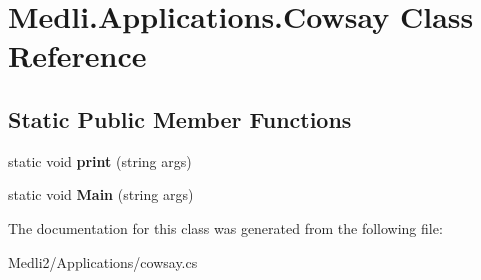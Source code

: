 \hypertarget{class_medli_1_1_applications_1_1_cowsay}{}\section{Medli.\+Applications.\+Cowsay Class Reference}
\label{class_medli_1_1_applications_1_1_cowsay}
\subsection*{Static Public Member Functions}
\begin{DoxyCompactItemize}
\item 
\mbox{\label{class_medli_1_1_applications_1_1_cowsay_a0ad9bb6cbac5420df2c8b218f436d370}} 
static void {\bfseries print} (string args)
\item 
\mbox{\label{class_medli_1_1_applications_1_1_cowsay_abf498507db19f276555f430ddf66aa7f}} 
static void {\bfseries Main} (string args)
\end{DoxyCompactItemize}


The documentation for this class was generated from the following file\+:\begin{DoxyCompactItemize}
\item 
Medli2/\+Applications/cowsay.\+cs\end{DoxyCompactItemize}

